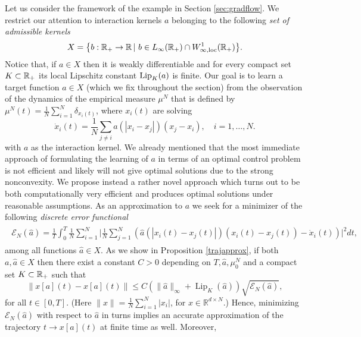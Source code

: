 Let us consider the framework of the example in Section \ref{sec:gradflow}. We restrict our attention to interaction kernels $a$ belonging to the following \textit{set of admissible kernels}
\begin{align*}
	X=\bigl\{b:\mathbb{R}_+\rightarrow\mathbb{R}\,|\ b \in L_{\infty}(\mathbb{R}_+) \cap W^{1}_{\infty,\textup{loc}}(\mathbb{R}_+) \bigr \}.
\end{align*}
Notice that, if $a \in X$ then it is weakly differentiable and for every compact set $K \subset \mathbb{R}_+$ its local Lipschitz constant $\textup{Lip}_{K}(a)$ is finite.
Our goal is to learn a target function $a \in X$ (which we fix throughout the section) from the observation of the dynamics of the empirical measure $\mu^N$ that is defined by $\mu^N(t)=\frac{1}{N} \sum_{i=1}^N \delta_{x_i(t)}$, where $x_i(t)$ are solving
\begin{equation}\label{fdgradientflow2}
\dot x_i(t) = \frac{1}{N} \sum_{j \neq i} a(| x_i -  x_j |) (x_j - x_i), \quad i=1,\dots,N.
\end{equation}
with $a$ as the interaction kernel. We already mentioned that the  most immediate approach of formulating the learning of $a$ in terms of an optimal control problem is not efficient and likely will not give optimal solutions due to the strong nonconvexity. We propose instead a rather novel approach which turns out to be both computationally very efficient and   produces optimal solutions under reasonable assumptions. As an approximation to $a$ we seek for a minimizer of the following \textit{discrete error functional}
\begin{align}\label{eq-def-error1}
	\begin{split}
	\mathcal E_N(\widehat a) = \frac{1}{T}\int_0^T\frac{1}{N}\sum_{i=1}^N\biggl|\frac{1}{N}\sum_{j=1}^N
			\left(\widehat a(|x_i(t)-x_j(t)|)(x_i(t) - x_j(t))-\dot{x}_i(t)\right)\biggr|^2 dt,
	\end{split}
\end{align}
among all functions $\widehat a \in X$. As we show in Proposition \ref{trajapprox}, if both $a, \widehat a \in X$ then there exist a constant $C>0$ depending on $T, \widehat a, \mu_0^N$ and a compact set $K \subset \mathbb{R}_+$ such that
$$
\| x[a](t) -x[a](t) \| \leq C (\|\widehat a\|_\infty + \operatorname{Lip}_K(\widehat a)) \sqrt{\mathcal E_N(\widehat a)}, 
$$
for all $t \in [0,T]$. (Here $\| x \| = \frac{1}{N} \sum_{i=1}^N |x_i|$, for $x \in \mathbb R^{d \times N}$.) Hence, minimizing $\mathcal E_N(\widehat a)$ with respect to $\widehat a$ in turns implies an accurate approximation of the trajectory $t \to x[a](t)$ at finite time as well. Moreover,
